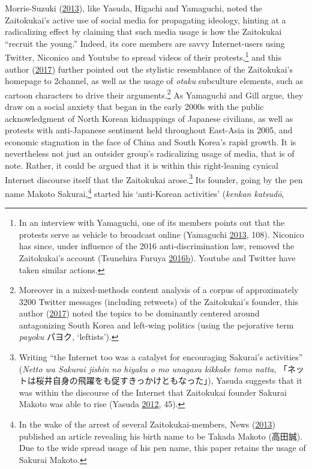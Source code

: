 \documentclass[10pt,british,A4paper,oneside]{memoir}
\begin{document}
Morris-Suzuki
(\protect\hyperlink{ref-morris-suzuki_freedom_2013}{2013}), like Yasuda,
Higachi and Yamaguchi, noted the Zaitokukai's active use of social media
for propagating ideology, hinting at a radicalizing effect by claiming
that such media usage is how the Zaitokukai ``recruit the young.''
Indeed, its core members are savvy Internet-users using Twitter,
Niconico and Youtube to spread videos of their protests,\footnote{In an
  interview with Yamaguchi, one of its members points out that the
  protests serve as vehicle to broadcast online (Yamaguchi
  \protect\hyperlink{ref-yamaguchi_xenophobia_2013}{2013}, 108).
  Niconico has since, under influence of the 2016 anti-discrimination
  law, removed the Zaitokukai's account (Tsunehira Furuya
  \protect\hyperlink{ref-furuya_can_2016}{2016}\protect\hyperlink{ref-furuya_can_2016}{b}).
  Youtube and Twitter have taken similar actions.} and this author
(\protect\hyperlink{ref-poppe_digitaal_2017}{2017}) further pointed out
the stylistic resemblance of the Zaitokukai's homepage to 2channel, as
well as the usage of \emph{otaku} subculture elements, such as cartoon
characters to drive their arguments.\footnote{Moreover in a
  mixed-methods content analysis of a corpus of approximately 3200
  Twitter messages (including retweets) of the Zaitokukai's founder,
  this author (\protect\hyperlink{ref-poppe_digitaal_2017}{2017}) noted
  the topics to be dominantly centered around antagonizing South Korea
  and left-wing politics (using the pejorative term \emph{payoku}
  パヨク, `leftists').} As Yamaguchi and Gill argue, they draw on a
social anxiety that began in the early 2000s with the public
acknowledgment of North Korean kidnappings of Japanese civilians, as
well as protests with anti-Japanese sentiment held throughout East-Asia
in 2005, and economic stagnation in the face of China and South Korea's
rapid growth. It is nevertheless not just an outsider group's
radicalizing usage of media, that is of note. Rather, it could be argued
that it is within this right-leaning cynical Internet discourse itself
that the Zaitokukai arose.\footnote{Writing ``the Internet too was a
  catalyst for encouraging Sakurai's activities'' (\emph{Netto wa
  Sakurai jishin no hiyaku o mo unagasu kikkake tomo natta},
  「ネットは桜井自身の飛躍をも促すきっかけともなった」), Yasuda suggests
  that it was within the discourse of the Internet that Zaitokukai
  founder Sakurai Makoto was able to rise (Yasuda
  \protect\hyperlink{ref-yasuda_eng:_2012}{2012}, 45).} Its founder,
going by the pen name Makoto Sakurai,\footnote{In the wake of the arrest
  of several Zaitokukai-members, News
  (\protect\hyperlink{ref-nikkei_news__2013}{2013}) published an article
  revealing his birth name to be Takada Makoto (高田誠). Due to the wide
  spread usage of his pen name, this paper retains the usage of Sakurai
  Makoto.} started his `anti-Korean activities' (\emph{kenkan katsudō},
\end{document}
